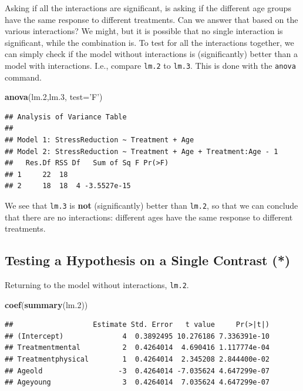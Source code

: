 \documentclass[]{book}
\newenvironment{Shaded}{\begin{snugshade}}{\end{snugshade}}
\newcommand{\KeywordTok}[1]{\textcolor[rgb]{0.13,0.29,0.53}{\textbf{#1}}}
\newcommand{\DataTypeTok}[1]{\textcolor[rgb]{0.13,0.29,0.53}{#1}}
\newcommand{\DecValTok}[1]{\textcolor[rgb]{0.00,0.00,0.81}{#1}}
\newcommand{\StringTok}[1]{\textcolor[rgb]{0.31,0.60,0.02}{#1}}
\newcommand{\NormalTok}[1]{#1}
\theoremstyle{definition}
\theoremstyle{definition}
\theoremstyle{definition}
\theoremstyle{remark}
\begin{document}
Asking if all the interactions are significant, is asking if the
different age groups have the same response to different treatments. Can
we answer that based on the various interactions? We might, but it is
possible that no single interaction is significant, while the
combination is. To test for all the interactions together, we can simply
check if the model without interactions is (significantly) better than a
model with interactions. I.e., compare \texttt{lm.2} to \texttt{lm.3}.
This is done with the \texttt{anova} command.

\begin{Shaded}
\begin{Highlighting}[]
\KeywordTok{anova}\NormalTok{(lm.}\DecValTok{2}\NormalTok{,lm.}\DecValTok{3}\NormalTok{, }\DataTypeTok{test=}\StringTok{'F'}\NormalTok{)}
\end{Highlighting}
\end{Shaded}

\begin{verbatim}
## Analysis of Variance Table
## 
## Model 1: StressReduction ~ Treatment + Age
## Model 2: StressReduction ~ Treatment + Age + Treatment:Age - 1
##   Res.Df RSS Df   Sum of Sq F Pr(>F)
## 1     22  18                        
## 2     18  18  4 -3.5527e-15
\end{verbatim}

We see that \texttt{lm.3} is \textbf{not} (significantly) better than
\texttt{lm.2}, so that we can conclude that there are no interactions:
different ages have the same response to different treatments.

\subsection{Testing a Hypothesis on a Single Contrast
(*)}\label{testing-a-hypothesis-on-a-single-contrast}

Returning to the model without interactions, \texttt{lm.2}.

\begin{Shaded}
\begin{Highlighting}[]
\KeywordTok{coef}\NormalTok{(}\KeywordTok{summary}\NormalTok{(lm.}\DecValTok{2}\NormalTok{))}
\end{Highlighting}
\end{Shaded}

\begin{verbatim}
##                   Estimate Std. Error   t value     Pr(>|t|)
## (Intercept)              4  0.3892495 10.276186 7.336391e-10
## Treatmentmental          2  0.4264014  4.690416 1.117774e-04
## Treatmentphysical        1  0.4264014  2.345208 2.844400e-02
## Ageold                  -3  0.4264014 -7.035624 4.647299e-07
## Ageyoung                 3  0.4264014  7.035624 4.647299e-07
\end{verbatim}
\end{document}
